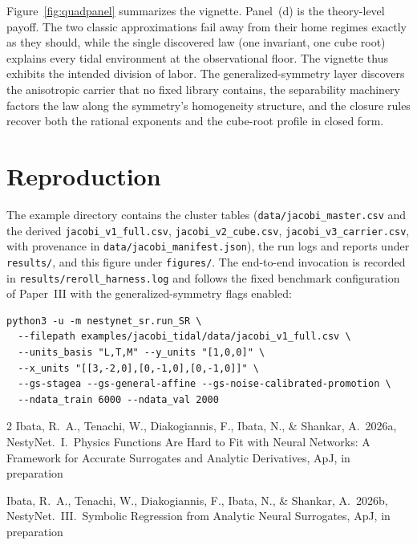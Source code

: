 \documentclass[11pt]{article}
\begin{document}
Figure~\ref{fig:quadpanel} summarizes the vignette.  Panel~(d) is the
theory-level payoff.  The two classic approximations fail away from
their home regimes exactly as they should, while the single discovered
law (one invariant, one cube root) explains every tidal environment at
the observational floor.  The vignette thus exhibits the intended
division of labor.  The generalized-symmetry layer discovers the
anisotropic carrier that no fixed library contains, the separability
machinery factors the law along the symmetry's homogeneity structure,
and the closure rules recover both the rational exponents and the
cube-root profile in closed form.

\section{Reproduction}

The example directory contains the cluster tables
(\texttt{data/jacobi\_master.csv} and the derived
\texttt{jacobi\_v1\_full.csv}, \texttt{jacobi\_v2\_cube.csv},
\texttt{jacobi\_v3\_carrier.csv}, with provenance in
\texttt{data/jacobi\_manifest.json}), the run logs and reports under
\texttt{results/}, and this figure under \texttt{figures/}.  The
end-to-end invocation is recorded in
\texttt{results/reroll\_harness.log} and follows the fixed benchmark
configuration of Paper~III with the generalized-symmetry flags enabled:
%
\begin{verbatim}
python3 -u -m nestynet_sr.run_SR \
  --filepath examples/jacobi_tidal/data/jacobi_v1_full.csv \
  --units_basis "L,T,M" --y_units "[1,0,0]" \
  --x_units "[[3,-2,0],[0,-1,0],[0,-1,0]]" \
  --gs-stagea --gs-general-affine --gs-noise-calibrated-promotion \
  --ndata_train 6000 --ndata_val 2000
\end{verbatim}

\begin{thebibliography}{2}
\bibitem[Ibata et al.(2026a)]{NestyNet2026a}
Ibata, R.~A., Tenachi, W., Diakogiannis, F., Ibata, N., \& Shankar, A.\
2026a, NestyNet.\ I.\ Physics Functions Are Hard to Fit with Neural
Networks: A Framework for Accurate Surrogates and Analytic Derivatives,
ApJ, in preparation

\bibitem[Ibata et al.(2026b)]{NestyNet2026b}
Ibata, R.~A., Tenachi, W., Diakogiannis, F., Ibata, N., \& Shankar, A.\
2026b, NestyNet.\ III.\ Symbolic Regression from Analytic Neural
Surrogates, ApJ, in preparation
\end{thebibliography}
\end{document}
